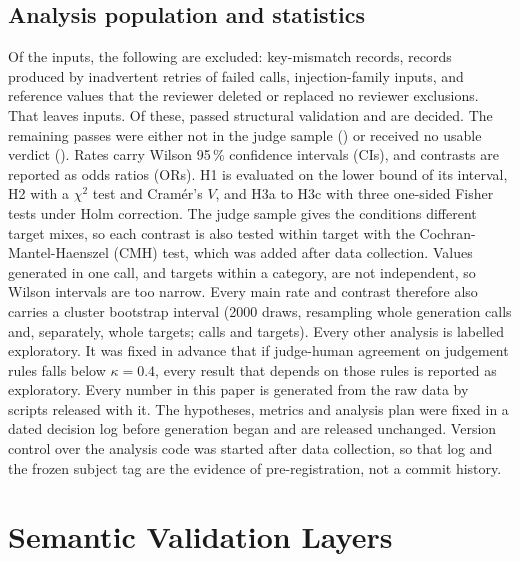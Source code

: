 \documentclass[conference]{IEEEtran}
\begin{document}
\subsection{Analysis population and statistics}
Of the  inputs, the following are excluded:  key-mismatch records,
 records produced by inadvertent retries of failed calls,  injection-family
inputs, and\ifreviewed{}  reference values that the reviewer deleted or
replaced\else{} no reviewer exclusions\fi. That leaves  inputs. Of these, 
passed structural validation and  are decided. The remaining passes were either not in
the judge sample () or received no usable verdict
(). Rates carry Wilson 95\,\% confidence intervals (CIs), and contrasts are
reported as odds ratios (ORs). H1 is evaluated on the lower bound of its interval, H2 with a $\chi^2$
test and Cram\'er's $V$, and H3a to H3c with three one-sided Fisher tests under Holm correction. The
judge sample gives the conditions different target mixes, so each contrast is also tested within target
with the Cochran-Mantel-Haenszel (CMH) test, which was added after data collection. Values generated
in one call, and targets within a category, are not independent, so Wilson intervals are too narrow.
Every main rate and contrast therefore also carries a cluster bootstrap interval (2000 draws,
resampling whole generation calls and, separately, whole targets;  calls and
 targets). Every other analysis is labelled
exploratory. It was fixed in advance that if judge-human agreement on judgement rules falls below
$\kappa=0.4$, every result that depends on those rules is reported as exploratory. Every number in this
paper is generated from the raw data by scripts released with it. The hypotheses, metrics and analysis
plan were fixed in a dated decision log before generation began and are released unchanged. Version
control over the analysis code was started after data collection, so that log and the frozen subject
tag are the evidence of pre-registration, not a commit history.

\section{Semantic Validation Layers}
\label{sec:layer}
\end{document}
